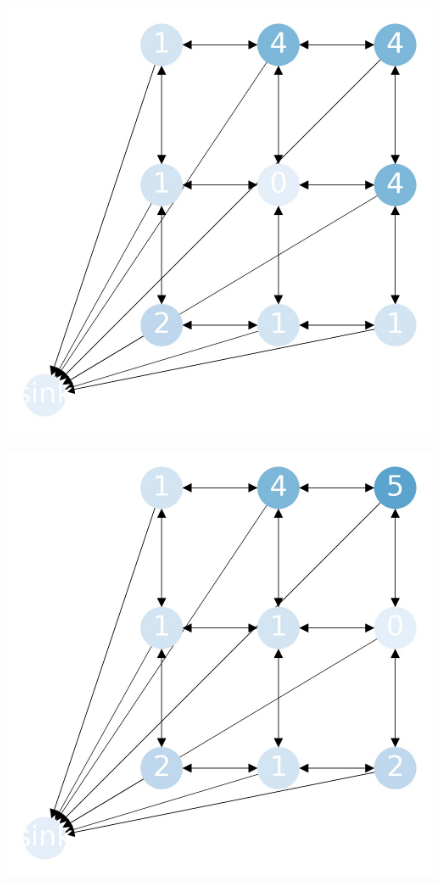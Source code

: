 \documentclass{beamer}
\begin{document}
\begin{frame}
  \begin{figure}[h!]
    \centering
      \includegraphics[scale=0.25]{sandpile_30}
  \end{figure}
\end{frame}


\begin{frame}
  \begin{figure}[h!]
    \centering
      \includegraphics[scale=0.25]{sandpile_31}
  \end{figure}
\end{frame}
\end{document}
